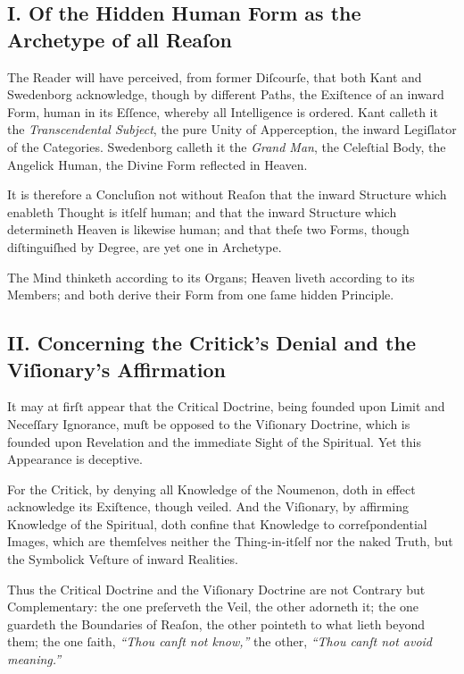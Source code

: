\documentclass[12pt]{article}
\begin{document}
\subsection*{I. Of the Hidden Human Form as the Archetype of all Reaſon}

The Reader will have perceived, from former Diſcourſe, that both Kant and 
Swedenborg acknowledge, though by different Paths, the Exiſtence of an inward 
Form, human in its Eſſence, whereby all Intelligence is ordered. Kant calleth 
it the \textit{Transcendental Subject}, the pure Unity of Apperception, the inward 
Legiſlator of the Categories. Swedenborg calleth it the \textit{Grand Man}, the 
Celeſtial Body, the Angelick Human, the Divine Form reflected in Heaven.

It is therefore a Concluſion not without Reaſon that the inward Structure 
which enableth Thought is itſelf human; and that the inward Structure which 
determineth Heaven is likewise human; and that theſe two Forms, though 
diſtinguiſhed by Degree, are yet one in Archetype.

The Mind thinketh according to its Organs; Heaven liveth according to its 
Members; and both derive their Form from one ſame hidden Principle.

\subsection*{II. Concerning the Critick’s Denial and the Viſionary’s Affirmation}

It may at firſt appear that the Critical Doctrine, being founded upon Limit and 
Neceſſary Ignorance, muſt be opposed to the Viſionary Doctrine, which is 
founded upon Revelation and the immediate Sight of the Spiritual. Yet this 
Appearance is deceptive.

For the Critick, by denying all Knowledge of the Noumenon, doth in effect 
acknowledge its Exiſtence, though veiled. And the Viſionary, by affirming 
Knowledge of the Spiritual, doth confine that Knowledge to correſpondential 
Images, which are themſelves neither the Thing-in-itſelf nor the naked Truth, 
but the Symbolick Veſture of inward Realities.

Thus the Critical Doctrine and the Viſionary Doctrine are not Contrary but 
Complementary: the one preſerveth the Veil, the other adorneth it; the one 
guardeth the Boundaries of Reaſon, the other pointeth to what lieth beyond 
them; the one ſaith, \textit{“Thou canſt not know,”} the other, \textit{“Thou canſt not avoid 
meaning.”}
\end{document}
